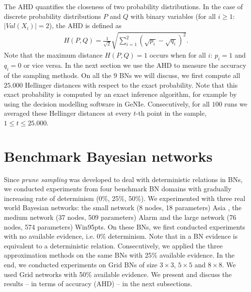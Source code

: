 \documentclass[a4paper, twoside, 11pt]{report}
\theoremstyle{plain}
\theoremstyle{definition}
\theoremstyle{remark}
\newcommand{\ps}{\textit{prune sampling }}
\begin{document}
The \gls{AHD} quantifies the closeness of two probability distributions. In the case of discrete probability distributions $P$ and $Q$ with binary variables (for all $i\geq 1$: $|Val(X_i)| = 2$), the AHD is defined as
\begin{align*}
H(P,Q) = \frac{1}{\sqrt{2}}\sqrt{ \sum_{i=1}^2 ( \sqrt{p_i} - \sqrt{q_i})^2 }.
\end{align*}
Note that the maximum distance $H(P,Q) = 1$ occurs when for all $i$: $p_i =1$ and $q_i = 0$ or vice versa. In the next section we use the AHD to measure the accuracy of the sampling methods. On all the 9 BNs we will discuss, we first compute all $25.000$ Hellinger distances with respect to the exact probability. Note that this exact probability is computed by an exact inference algorithm, for example by using the decision modelling software in GeNIe. Consecutively, for all $100$ runs we averaged these Hellinger distances at every $t$-th point in the sample, $1 \leq t \leq 25.000$. 

\section{Benchmark Bayesian networks}\label{BenchBNs}
Since \ps was developed to deal with deterministic relations in BNs, we conducted experiments from four benchmark BN domains with gradually increasing rate of determinism (0\%, 25\%, 50\%). We experimented with three real world Bayesian networks: the small network (8 nodes, 18 parameters) Asia \cite{lauritzen1988local}, the medium network (37 nodes, 509 parameters) Alarm \cite{beinlich1989alarm} and the large network (76 nodes, 574 parameters) Win95pts. On these BNs, we first conducted experiments with no available evidence, i.e. 0\% determinism. Note that in a BN evidence is equivalent to a deterministic relation. Consecutively, we applied the three approximation methods on the same BNs with 25\% available evidence. In the end, we conducted experiments on Grid BNs  \cite{sang2005solving} of size $3 \times 3$, $5 \times 5$ and $8 \times 8$. We used Grid networks with 50\% available evidence. We present and discuss the results -- in terms of accuracy (AHD) -- in the next subsections.
\end{document}
